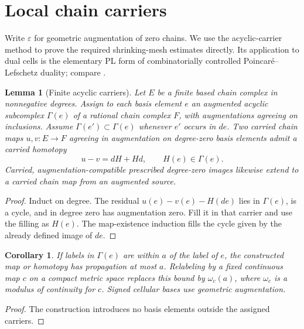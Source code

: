 \documentclass[11pt]{amsart}
\numberwithin{equation}{section}
\newtheorem{lemma}[lemma]{Lemma}
\newtheorem{corollary}[corollary]{Corollary}
\theoremstyle{definition}
\theoremstyle{remark}
\begin{document}
\section{Local chain carriers}\label{sec:carriers}

Write $\varepsilon$ for geometric augmentation of zero chains.
We use the acyclic-carrier method to prove the required shrinking-mesh
estimates directly.  Its application to dual cells is the elementary PL
form of combinatorially controlled Poincar\'e--Lefschetz duality; compare
\cite[Proposition 5.3, Theorem 6.7 and Corollary 6.8]{Ran99}.

\begin{lemma}[Finite acyclic carriers]\label{lem:finite-acyclic-carrier}
Let $E$ be a finite based chain complex in nonnegative degrees.  Assign
to each basis element $e$ an augmented acyclic subcomplex $\Gamma(e)$
of a rational chain complex $F$, with augmentations agreeing on inclusions.
Assume $\Gamma(e')\subset\Gamma(e)$ whenever $e'$ occurs in $de$.
Two carried chain maps $u,v:E\to F$ agreeing in augmentation on degree-zero
basis elements admit a carried homotopy
\[
u-v=dH+Hd,\qquad H(e)\in\Gamma(e).
\]
Carried, augmentation-compatible prescribed degree-zero images likewise extend
to a carried chain map from an augmented source.
\end{lemma}
\begin{proof}
Induct on degree.  The residual $u(e)-v(e)-H(de)$ lies in $\Gamma(e)$,
is a cycle, and in degree zero has augmentation zero.  Fill it in that
carrier and use the filling as $H(e)$.  The map-existence induction fills
the cycle given by the already defined image of $de$.
\end{proof}

\begin{corollary}\label{cor:carrier-control}
If labels in $\Gamma(e)$ are within $a$ of the label of $e$, the constructed
map or homotopy has propagation at most $a$.  Relabeling by a fixed
continuous map $c$ on a compact metric space replaces this bound by
$\omega_c(a)$, where $\omega_c$ is a modulus of continuity for $c$.
Signed cellular bases use geometric augmentation.
\end{corollary}
\begin{proof}
The construction introduces no basis elements outside the assigned carriers.
\end{proof}
\end{document}
